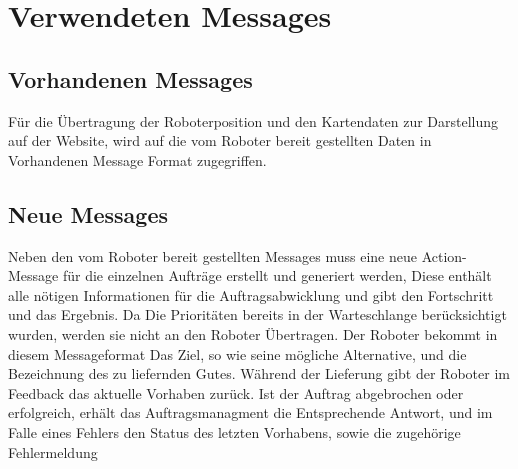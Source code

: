 \section{Verwendeten Messages}
\subsection{Vorhandenen Messages}
Für die Übertragung der Roboterposition und den Kartendaten zur Darstellung auf der Website, wird auf die vom Roboter bereit gestellten Daten in Vorhandenen Message Format zugegriffen.

\subsection{Neue Messages}
Neben den vom Roboter bereit gestellten Messages muss eine neue Action-Message für die einzelnen Aufträge erstellt und generiert werden,
Diese enthält alle nötigen Informationen für die Auftragsabwicklung und gibt den Fortschritt und das Ergebnis.
Da Die Prioritäten bereits in der Warteschlange berücksichtigt wurden, werden sie nicht an den Roboter Übertragen.
Der Roboter bekommt in diesem Messageformat Das Ziel, so wie seine mögliche Alternative, und die Bezeichnung des zu liefernden Gutes.
Während der Lieferung gibt der Roboter im Feedback das aktuelle Vorhaben zurück.
Ist der Auftrag abgebrochen oder erfolgreich, erhält das Auftragsmanagment die Entsprechende Antwort,
und im Falle eines Fehlers den Status des letzten Vorhabens, sowie die zugehörige Fehlermeldung



